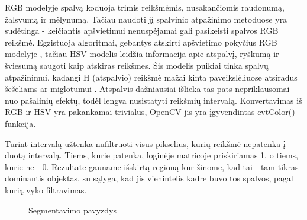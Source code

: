\documentclass{VUMIFPSbakalaurinis}
\begin{document}
RGB modelyje spalvą koduoja trimis reikšmėmis, nusakančiomis raudonumą, žalsvumą ir mėlynumą. Tačiau naudoti jį spalvinio atpažinimo metoduose yra sudėtinga - keičiantis apšvietimui nenuspėjamai gali pasikeisti spalvos RGB reikšmė. Egzistuoja algoritmai, gebantys atskirti apšvietimo pokyčius RGB modelyje \cite{1220504}, tačiau HSV modelis leidžia informacija apie atspalvį, ryškumą ir šviesumą saugoti kaip atskiras reikšmes. Šis modelis puikiai tinka spalvų atpažinimui, kadangi H (atspalvio) reikšmė mažai kinta paveikslėliuose atsiradus šešėliams \cite{1039893} ar miglotumui \cite{7457892}. Atspalvis dažniausiai išlieka tas pats nepriklausomai nuo pašalinių efektų, todėl lengva nusistatyti reikšmių intervalą. Konvertavimas iš RGB ir HSV yra pakankamai trivialus, OpenCV jis yra įgyvendintas cvtColor() funkcija. 

Turint intervalą užtenka nufiltruoti visus pikselius, kurių reikšmė nepatenka į duotą intervalą. Tiems, kurie patenka, loginėje matricoje priskiriamas 1, o tiems, kurie ne - 0. Rezultate gauname išskirtą regioną kur žinome, kad tai - tam tikras dominantis objektas, su sąlyga, kad jis vienintelis kadre buvo tos spalvos, pagal kurią vyko filtravimas. 
\begin{figure}[H]
	\centering
	\qquad
	\caption{Segmentavimo pavyzdys}
	\label{fig:example}
\end{figure}
\end{document}
